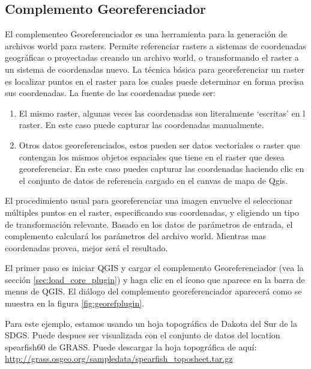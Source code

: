 
\subsection{Complemento Georeferenciador}


El complementeo Georeferenciador es una herramienta para la generación de archivos world para rasters.
Permite referenciar rasters a sistemas de coordenadas geográficas o proyectadas creando un archivo world, o transformando el raster a un sistema de coordenadas nuevo. La técnica básica para georeferenciar un raster es localizar puntos en el raster para los cuales puede determinar en forma precisa sus coordenadas. La fuente de las coordenadas puede ser:

\begin{enumerate}
\item El mismo raster, algunas veces las coordenadas son literalmente `escritas' en l raster. 
En este caso puede capturar las coordenadas manualmente.
\item Otros datos georeferenciados, estos pueden ser datos vectoriales o raster que contengan los mismos objetos espaciales que tiene en el raster que desea georeferenciar. En este caso puedes capturar las coordenadas haciendo clic en el conjunto de datos de referencia cargado en el canvas de mapa de Qgis.
\end{enumerate}

El procedimiento usual para georeferenciar una imagen envuelve el seleccionar múltiples puntos en el raster, especificando sus coordenadas, y eligiendo un tipo de transformación relevante. Basado en los datos de parámetros de entrada, el complemento calculará los parámetros del archivo world. Mientras mas coordenadas provea, mejor será el resultado.

El primer paso es iniciar QGIS y cargar el complemento Georeferenciador (vea la sección 
\ref{sec:load_core_plugin}) y haga clic en el ícono  que aparece en la barra de menus de QGIS. El diálogo del complemento georeferenciador aparecerá como se muestra en la figura \ref{fig:georefplugin}.
  
Para este ejemplo, estamos usando un hoja topográfica de Dakota del Sur de la SDGS. Puede despues ser visualizada con el conjunto de datos del location spearfish60 de GRASS. Puede descargar la hoja topográfica de aquí: 
\url{http://grass.osgeo.org/sampledata/spearfish\_toposheet.tar.gz}


